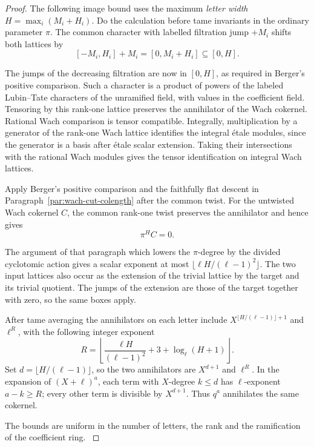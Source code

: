 \begin{proof}
The following image bound uses the maximum \emph{letter width}
\(H=\max_i(M_i+H_i)\). Do the calculation before tame invariants
in the ordinary parameter \(\pi\).
The common character with labelled filtration jump \(+M_i\) shifts both lattices by
\[
 [-M_i,H_i]+M_i=[0,M_i+H_i]\subseteq[0,H].
\]

The jumps of the decreasing filtration are now in \([0,H]\),
as required in Berger's positive comparison. Such a character is a product
of powers of the labeled Lubin--Tate characters of the
unramified field, with values in the coefficient field.
\cite[Proposition 2.3]{berger-lubin-tate}
Tensoring by this rank-one lattice preserves the annihilator
of the Wach cokernel. Rational Wach comparison is tensor
compatible. Integrally, multiplication by a generator of the
rank-one Wach lattice identifies the integral \'etale modules,
since the generator is a basis after \'etale scalar extension.
Taking their intersections with the rational Wach modules gives
the tensor identification on integral Wach lattices.
\cite[Proposition III.4.2]{berger-wach}

Apply Berger's positive comparison and the faithfully flat
descent in Paragraph~\ref{par:wach-cut-colength} after the common
twist. For the untwisted Wach cokernel \(C\), the common rank-one twist preserves the annihilator and hence gives
\[
 \pi^H C=0.
\]

The argument of that paragraph which lowers the \(\pi\)-degree
by the divided cyclotomic action gives a scalar exponent at most
\(\lfloor\ell H/(\ell-1)^2\rfloor\). The two input lattices also
occur as the extension of the trivial lattice by the target
and its trivial quotient. The jumps of the extension are those
of the target together with zero, so the same boxes apply.

After tame averaging the annihilators on each letter include
\(X^{\lfloor H/(\ell-1)\rfloor+1}\) and \(\ell^R\), with the following integer exponent
\[
 R=\left\lfloor \frac{\ell H}{(\ell-1)^2}
                 +3+\log_\ell(H+1)\right\rfloor .
\]
Set \(d=\lfloor H/(\ell-1)\rfloor\), so the two annihilators are
\(X^{d+1}\) and \(\ell^R\). In the expansion of \((X+\ell)^a\),
each term with \(X\)-degree \(k\le d\) has \(\ell\)-exponent
\(a-k\ge R\); every other term is divisible by \(X^{d+1}\).
Thus \(q^a\) annihilates the same cokernel.

The bounds are uniform in the number of letters,
the rank and the ramification of the coefficient ring.
\label{cor:inert-thick-initial-1}

\end{proof}

